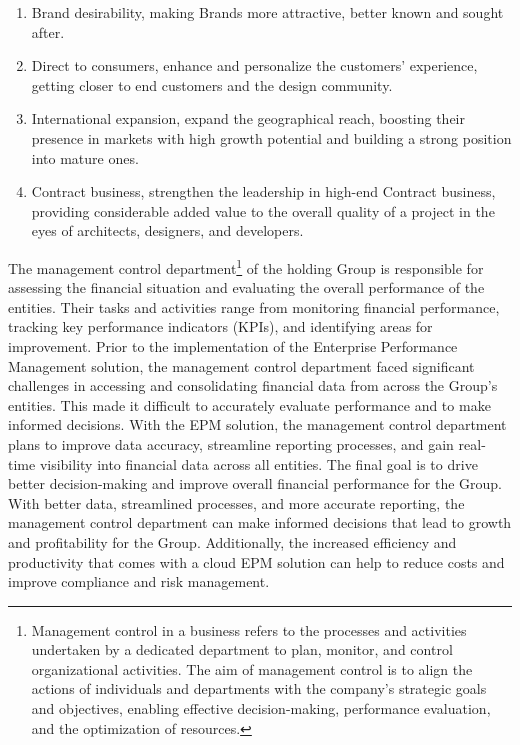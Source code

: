 \documentclass[12pt,a4paper,openright,twoside]{book}
\begin{document}
\begin{enumerate}
    \item Brand desirability, making Brands more attractive, better known and sought after.
    \item Direct to consumers, enhance and personalize the customers’ experience, getting closer to end customers and the design community.
    \item International expansion, expand the geographical reach, boosting their presence in markets with high growth potential and building a strong position into mature ones.
    \item Contract business, strengthen the leadership in high-end Contract business, providing considerable added value to the overall quality of a project in the eyes of architects, designers, and developers.
\end{enumerate}

The management control department\footnote{Management control in a business refers to the processes and activities undertaken by a dedicated department to plan, monitor, and control organizational activities. The aim of management control is to align the actions of individuals and departments with the company's strategic goals and objectives, enabling effective decision-making, performance evaluation, and the optimization of resources.} of the holding Group is responsible for assessing the financial situation and evaluating the overall performance of the entities.
%
Their tasks and activities range from monitoring financial performance, tracking key performance indicators (KPIs), and identifying areas for improvement.
%
Prior to the implementation of the Enterprise Performance Management solution, the management control department faced significant challenges in accessing and consolidating financial data from across the Group's entities.
%
This made it difficult to accurately evaluate performance and to make informed decisions.
%
With the EPM solution, the management control department plans to improve data accuracy, streamline reporting processes, and gain real-time visibility into financial data across all entities. 
%
The final goal is to drive better decision-making and improve overall financial performance for the Group.
%
With better data, streamlined processes, and more accurate reporting, the management control department can make informed decisions that lead to growth and profitability for the Group. 
%
Additionally, the increased efficiency and productivity that comes with a cloud EPM solution can help to reduce costs and improve compliance and risk management.
\end{document}

